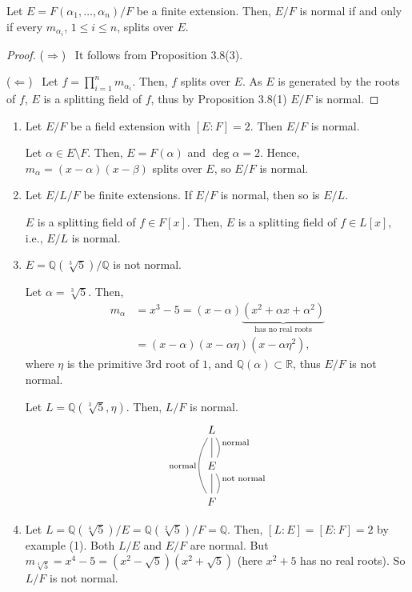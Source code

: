 \documentclass[twoside]{article}
\newcommand\Q{\mathbb Q}
\newcommand\R{\mathbb R}
\theoremstyle{remark}
\begin{document}
\begin{corollary}
  Let \(E = F(\alpha_1, \dots, \alpha_n)/F\) be a finite extension. Then, \(E/F\) is normal if and only if every \(m_{\alpha_i}\), \(1 \leq i \leq n\), splits over \(E\).
\end{corollary}

\begin{proof}
  (\(\Rightarrow\)) \ It follows from Proposition 3.8(3).
  
  (\(\Leftarrow\)) \ Let \(f = \prod_{i=1}^n m_{\alpha_i}\). Then, \(f\) splits over \(E\). As \(E\) is generated by the roots of \(f\), \(E\) is a splitting field of \(f\), thus by Proposition 3.8(1) \(E/F\) is normal.
\end{proof}

\begin{examples}
  \begin{enumerate}[label=\arabic*.]
    \item Let \(E/F\) be a field extension with \([E:F] = 2\). Then \(E/F\) is normal. \par
    Let \(\alpha \in E \setminus F\). Then, \(E = F(\alpha)\) and \(\deg\alpha = 2\). Hence, \(m_\alpha = (x-\alpha) (x-\beta)\) splits over \(E\), so \(E/F\) is normal.
    
    \item Let \(E/L/F\) be finite extensions. If \(E/F\) is normal, then so is \(E/L\). \par
    \(E\) is a splitting field of \(f \in F[x]\). Then, \(E\) is a splitting field of \(f \in L[x]\), i.e., \(E/L\) is normal.
    
    \item \(E = \Q(\sqrt[3]5)/\Q\) is not normal. \par
    Let \(\alpha = \sqrt[3]5\). Then,
    \begin{align*}
      m_\alpha & = x^3-5 = (x-\alpha) \underbrace{(x^2+\alpha x+\alpha^2)}_{\text{has no real roots}} \\
      & = (x-\alpha) (x-\alpha\eta) (x-\alpha\eta^2),
    \end{align*}
    where \(\eta\) is the primitive 3rd root of \(1\), and \(\Q(\alpha) \subset \R\), thus \(E/F\) is not normal. \par
    Let \(L = \Q(\sqrt[3]5, \eta)\). Then, \(L/F\) is normal.
    \begin{displaymath}
      \begin{tikzcd}
        L\dar[dash]\dar[dash,bend left,"\text{normal}"]\arrow[dd,dash,bend right,"\text{normal}"swap] \\
        E\dar[dash]\dar[dash,bend left,"\text{not normal}"] \\
        F
      \end{tikzcd}
    \end{displaymath}
    
    \item Let \(L = \Q(\sqrt[4]5)/E = \Q(\sqrt[2]5)/F = \Q\). Then, \([L:E] = [E:F] = 2\) by example (1). Both \(L/E\) and \(E/F\) are normal. But \(m_{\sqrt[4]5} = x^4-5 = (x^2-\sqrt5) (x^2+\sqrt5)\) (here \(x^2+5\) has no real roots). So \(L/F\) is not normal.
  \end{enumerate}
\end{examples}
\end{document}
